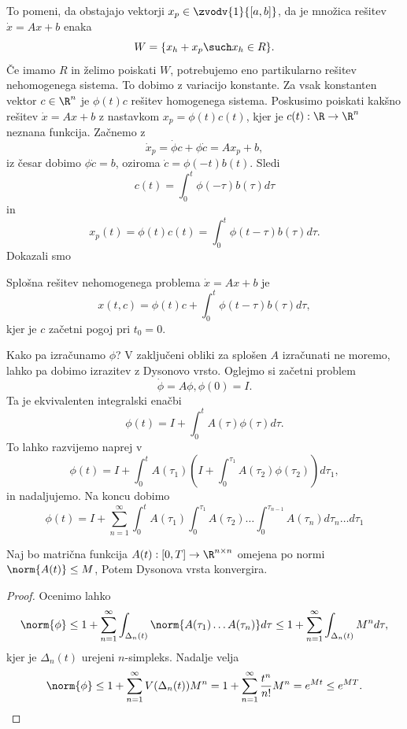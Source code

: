 To pomeni, da obstajajo vektorji $x_p \in \zvodv{1}{[a,b]}$, da je množica
rešitev $\dot{x} = Ax+b$ enaka
\[
  W = \{x_h + x_p \such x_h \in R\}.
\]
Če imamo $R$ in želimo poiskati $W$, potrebujemo eno partikularno rešitev
nehomogenega sistema.
To dobimo z variacijo konstante.
Za vsak konstanten vektor $c \in \R^n$ je $\phi(t) c$ rešitev homogenega
sistema.
Poskusimo poiskati kakšno rešitev $\dot{x} = Ax+b$ z nastavkom $x_p = \phi(t)
c(t)$, kjer je $c(t): \R \to \R^n$ neznana funkcija.
Začnemo z
\[
  \dot{x}_p = \dot{\phi} c + \phi \dot{c}
  = A x_p + b,
\]
iz česar dobimo $\phi \dot{c} = b$, oziroma $\dot{c} = \phi(-t) b(t)$.
Sledi
\[
  c(t) = \int_0^t \phi(-\tau) b(\tau) d\tau
\]
in
\[
  x_p(t) = \phi(t) c(t)
  = \int_0^t \phi(t-\tau) b(\tau) d\tau.
\]
Dokazali smo

\begin{trditev}
  Splošna rešitev nehomogenega problema $\dot{x} = Ax+b$ je
  \[
	x(t,c) = \phi(t) c + \int_0^t \phi(t-\tau) b(\tau) d\tau,
  \]
  kjer je $c$ začetni pogoj pri $t_0 = 0$.
\end{trditev}


Kako pa izračunamo $\phi$?
V zaključeni obliki za splošen $A$ izračunati ne moremo, lahko pa dobimo
izrazitev z Dysonovo vrsto.
Oglejmo si začetni problem
\[
  \dot{\phi} = A \phi, \phi(0) = I.
\]
Ta je ekvivalenten integralski enačbi
\[
  \phi(t) = I + \int_0^t A(\tau) \phi(\tau) d\tau.
\]
To lahko razvijemo naprej v
\[
  \phi(t) = I + \int_0^t A(\tau_1) \left( I + \int_0^{\tau_1} A(\tau_2)
	\phi(\tau_2) \right) d\tau_1,
\]
in nadaljujemo.
Na koncu dobimo
\[
  \phi(t)
  =
  I + \sum_{n=1}^\infty \int_0^t A(\tau_1) \int_0^{\tau_1} A(\tau_2) \ldots
  \int_0^{\tau_{n-1}} A(\tau_n) d\tau_n \ldots d\tau_1
\]

\begin{trditev}
  Naj bo matrična funkcija $A(t): [0, T] \to \R^{n \times n}$ omejena po normi
  $\norm{A(t)} \le M$,
  Potem Dysonova vrsta konvergira.
\end{trditev}

\begin{proof}
  Ocenimo lahko
  \[
	\norm{\phi}
	\le
	1 + \sum_{n=1}^\infty \int_{\Delta_n(t)} \norm{A(\tau_1) \ldots A(\tau_n)} d\tau
	\le
	1 + \sum_{n=1}^\infty \int_{\Delta_n(t)} M^n d\tau,
  \]
  kjer je $\Delta_n(t)$ urejeni $n$-simpleks.
  Nadalje velja
  \[
	\norm{\phi}
	\le 1 + \sum_{n=1}^\infty V(\Delta_n(t)) M^n
	= 1 + \sum_{n=1}^\infty \frac{t^n}{n!} M^n = e^{Mt} \le e^{MT}.
  \]
\end{proof}

